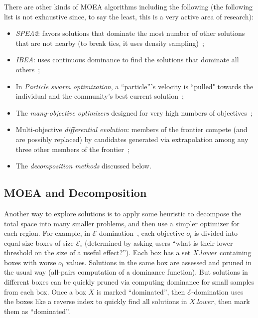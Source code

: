 \documentclass[10pt,journal,compsoc]{IEEEtran}
\newcommand{\bi}{\begin{itemize}}
\newcommand{\ei}{\end{itemize}}
\begin{document}
There are other kinds of MOEA algorithms including the following (the following list is not exhaustive since, to say the least, this is a very active area of research):
\bi
\item
{\em SPEA2}: favors solutions that dominate the most number of other solutions that are not nearby (to break ties, it uses density sampling)~\cite{zit02}; 
\item {\em  IBEA}: uses continuous dominance to find the solutions that dominate all others~\cite{Zitzler04indicator-basedselection}; 
\item In {\em Particle swarm optimization}, a ``particle'''s velocity is 
``pulled" towards the individual and the community's best current solution~\cite{pan08,V.Sedenka2010,Kennedy:2001:SI:370449,Poli07particleswarm,Coello04,Reyes-sierra06};
\item 
The {\em many-objective optimizers}  designed for very high numbers of objectives~\cite{deb14}; 
\item
Multi-objective {\em differential evolution}: members of the frontier compete (and are possibly replaced) by candidates generated via extrapolation among  any three other members of the frontier~\cite{storn97,5601760,abbass01,robic05};
\item
The {\em decomposition methods} discussed below.
\ei 


\subsection{MOEA and Decomposition}\label{sec:decomp}

Another way to explore solutions is to apply some heuristic to decompose the total space into many smaller problems, and then use a simpler optimizer for each region. 
For example, in $\mathcal{E}$-domination~\cite{deb05}, each objective $o_i$ is divided into equal size boxes of size $\mathcal{E}_i$ (determined by asking users ``what is their lower threshold on the size of a useful effect?'').  
Each box has a set $X.\mathit{lower}$ containing boxes with worse $o_i$ values.  
Solutions in the same box are assessed and pruned in the usual way (all-pairs computation of a dominance function). 
But solutions in different boxes can be quickly pruned via computing dominance for small samples from each box. 
Once a box $X$ is marked ``dominated'', then $\mathcal{E}$-domination uses the boxes like a reverse index to quickly find all solutions in $X.\mathit{lower}$, then mark them as ``dominated''.
\end{document}

